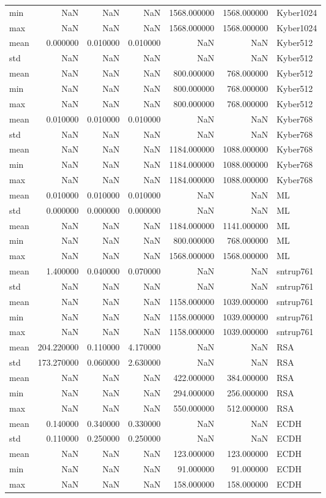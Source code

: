 \begin{table}
\begin{tabular}{lrrrrrl}
min & NaN & NaN & NaN & 1568.000000 & 1568.000000 & Kyber1024 \\
max & NaN & NaN & NaN & 1568.000000 & 1568.000000 & Kyber1024 \\
mean & 0.000000 & 0.010000 & 0.010000 & NaN & NaN & Kyber512 \\
std & NaN & NaN & NaN & NaN & NaN & Kyber512 \\
mean & NaN & NaN & NaN & 800.000000 & 768.000000 & Kyber512 \\
min & NaN & NaN & NaN & 800.000000 & 768.000000 & Kyber512 \\
max & NaN & NaN & NaN & 800.000000 & 768.000000 & Kyber512 \\
mean & 0.010000 & 0.010000 & 0.010000 & NaN & NaN & Kyber768 \\
std & NaN & NaN & NaN & NaN & NaN & Kyber768 \\
mean & NaN & NaN & NaN & 1184.000000 & 1088.000000 & Kyber768 \\
min & NaN & NaN & NaN & 1184.000000 & 1088.000000 & Kyber768 \\
max & NaN & NaN & NaN & 1184.000000 & 1088.000000 & Kyber768 \\
mean & 0.010000 & 0.010000 & 0.010000 & NaN & NaN & ML \\
std & 0.000000 & 0.000000 & 0.000000 & NaN & NaN & ML \\
mean & NaN & NaN & NaN & 1184.000000 & 1141.000000 & ML \\
min & NaN & NaN & NaN & 800.000000 & 768.000000 & ML \\
max & NaN & NaN & NaN & 1568.000000 & 1568.000000 & ML \\
mean & 1.400000 & 0.040000 & 0.070000 & NaN & NaN & sntrup761 \\
std & NaN & NaN & NaN & NaN & NaN & sntrup761 \\
mean & NaN & NaN & NaN & 1158.000000 & 1039.000000 & sntrup761 \\
min & NaN & NaN & NaN & 1158.000000 & 1039.000000 & sntrup761 \\
max & NaN & NaN & NaN & 1158.000000 & 1039.000000 & sntrup761 \\
mean & 204.220000 & 0.110000 & 4.170000 & NaN & NaN & RSA \\
std & 173.270000 & 0.060000 & 2.630000 & NaN & NaN & RSA \\
mean & NaN & NaN & NaN & 422.000000 & 384.000000 & RSA \\
min & NaN & NaN & NaN & 294.000000 & 256.000000 & RSA \\
max & NaN & NaN & NaN & 550.000000 & 512.000000 & RSA \\
mean & 0.140000 & 0.340000 & 0.330000 & NaN & NaN & ECDH \\
std & 0.110000 & 0.250000 & 0.250000 & NaN & NaN & ECDH \\
mean & NaN & NaN & NaN & 123.000000 & 123.000000 & ECDH \\
min & NaN & NaN & NaN & 91.000000 & 91.000000 & ECDH \\
max & NaN & NaN & NaN & 158.000000 & 158.000000 & ECDH \\
\bottomrule
\end{tabular}
\end{table}
